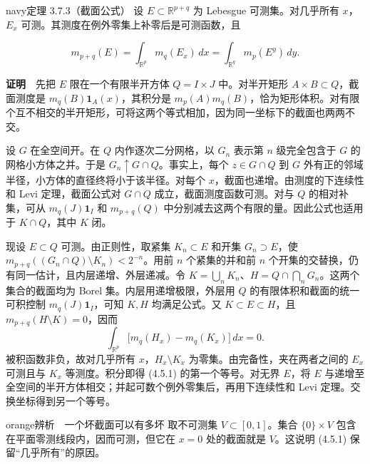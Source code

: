 \documentclass[11pt,a4paper]{article}
\begin{document}
\begin{sboxenv}{navy}{定理 3.7.3（截面公式）}
设 \(E\subset\mathbb R^{p+q}\) 为 Lebesgue 可测集。对几乎所有
\(x\)，\(E_x\) 可测。其测度在例外零集上补零后是可测函数，且

\begin{equation*}
m_{p+q}(E)=\int_{\mathbb R^p}m_q(E_x)\,dx
=\int_{\mathbb R^q}m_p(E^y)\,dy .
\tag{4.5.1}
\end{equation*}

\end{sboxenv}

\textbf{证明}　先把 \(E\) 限在一个有限半开方体 \(Q=I\times J\)
中。对半开矩形 \(A\times B\subset Q\)，截面测度是
\(m_q(B)\mathbf1_A(x)\)，其积分是
\(m_p(A)m_q(B)\)，恰为矩形体积。对有限个互不相交的半开矩形，可将这两个等式相加，因为同一坐标下的截面也两两不交。

设 \(G\) 在全空间开。在 \(Q\) 内作逐次二分网格，以 \(G_n\) 表示第 \(n\)
级完全包含于 \(G\) 的网格小方体之并。于是
\(G_n\uparrow G\cap Q\)。事实上，每个 \(z\in G\cap Q\) 到 \(G\)
外有正的邻域半径，小方体的直径终将小于该半径。对每个
\(x\)，截面也递增。由测度的下连续性和 Levi 定理，截面公式对 \(G\cap Q\)
成立，截面测度函数可测。对与 \(Q\) 的相对补集，可从 \(m_q(J)\mathbf1_I\)
和 \(m_{p+q}(Q)\) 中分别减去这两个有限的量。因此公式也适用于
\(K\cap Q\)，其中 \(K\) 闭。

现设 \(E\subset Q\) 可测。由正则性，取紧集 \(K_n\subset E\) 和开集
\(G_n\supset E\)，使 \(m_{p+q}((G_n\cap Q)\setminus K_n)<2^{-n}\)。用前
\(n\) 个紧集的并和前 \(n\)
个开集的交替换，仍有同一估计，且内层递增、外层递减。令
\(K=\bigcup_n K_n\)、\(H=Q\cap\bigcap_n G_n\)。这两个集合的截面均为
Borel 集。内层用递增极限，外层用 \(Q\) 的有限体积和截面的统一可积控制
\(m_q(J)\mathbf1_I\)，可知 \(K,H\) 均满足公式。又
\(K\subset E\subset H\)，且 \(m_{p+q}(H\setminus K)=0\)，因而 \begin{equation*}
\int_{\mathbb R^p}\bigl[m_q(H_x)-m_q(K_x)\bigr]\,dx=0 .
\end{equation*} 被积函数非负，故对几乎所有 \(x\)，\(H_x\setminus K_x\)
为零集。由完备性，夹在两者之间的 \(E_x\) 可测且与 \(K_x\)
等测度。积分即得 (4.5.1) 的第一个等号。对无界 \(E\)，将 \(E\)
与递增至全空间的半开方体相交；并起可数个例外零集后，再用下连续性和 Levi
定理。交换坐标得到另一个等号。

\begin{sboxenv}{orange}{辨析　一个坏截面可以有多坏}
取不可测集 \(V\subset[0,1]\)。集合 \(\{0\}\times V\)
包含在平面零测线段内，因而可测，但它在 \(x=0\) 处的截面就是
\(V\)。这说明 (4.5.1) 保留``几乎所有''的原因。

\end{sboxenv}
\end{document}
